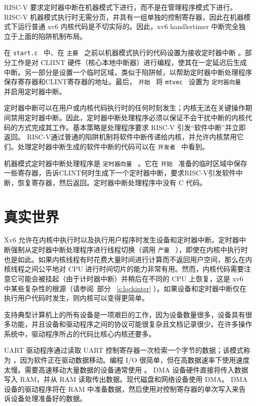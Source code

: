 \documentclass[UTF8]{article}
\begin{document}
RISC-V 要求定时器中断在机器模式下进行，而不是在管理程序模式下进行。 RISC-V 机器模式执行时无需分页，并具有一组单独的控制寄存器，因此在机器模式下运行普通 xv6 内核代码是不切实际的。因此，xv6 handlertimer 中断完全独立于上面的陷阱机制布局。  

在  {    \tt    start.c   }  中、在  {    \tt    主要   }  之前以机器模式执行的代码设置为接收定时器中断
        。部分工作是对 CLIINT 硬件（核心本地中断器）进行编程，使其在一定延迟后生成中断。另一部分是设置一个临时区域，类似于陷阱帧，以帮助定时器中断处理程序保存寄存器和CLINT寄存器的地址。最后， {    \tt    开始   }  将  {    \tt    mtvec   }  设置为  {    \tt    定时器向量   }  并启用定时器中断。  

定时器中断可以在用户或内核代码执行时的任何时刻发生；内核无法在关键操作期间禁用定时器中断。因此，定时器中断处理程序必须以保证不会干扰中断的内核代码的方式完成其工作。基本策略是处理程序要求 RISC-V 引发“软件中断”并立即返回。 RISC-V通过普通的陷阱机制将软件中断传递给内核，并允许内核禁用它们。处理定时器中断生成的软件中断的代码可以在  {    \tt    开发者   }         中看到。  

机器模式定时器中断处理程序是  {    \tt    定时器向量   } 
        。它在 {    \tt    开始   } 准备的临时区域中保存一些寄存器，告诉CLINT何时生成下一个定时器中断，要求RISC-V引发软件中断，恢复寄存器，然后返回。定时器中断处理程序中没有 C 代码。  

   \section{真实世界  }     

Xv6 允许在内核中执行时以及执行用户程序时发生设备和定时器中断。定时器中断强制从定时器中断处理程序进行线程切换（调用  {    \tt    产量   }  ），即使在内核中执行时也是如此。如果内核线程有时花费大量时间进行计算而不返回用户空间，那么在内核线程之间公平地对 CPU 进行时间切片的能力非常有用。然而，内核代码需要注意它可能会被挂起（由于计时器中断）并稍后在不同的 CPU 上恢复，这是 xv6 中某些复杂性的根源（请参阅~部分~    \ref{s:lockinter}    ）。如果设备和定时器中断仅在执行用户代码时发生，则内核可以变得更简单。  

支持典型计算机上的所有设备是一项艰巨的工作，因为设备数量很多，设备具有很多功能，并且设备和驱动程序之间的协议可能很复杂且文档记录很少。在许多操作系统中，驱动程序所占的代码比核心内核还要多。  

UART 驱动程序通过读取 UART 控制寄存器一次检索一个字节的数据；该模式称为        ，因为软件正在驱动数据移动。编程 I/O 很简单，但在高数据速率下使用速度太慢。需要高速移动大量数据的设备通常使用        。 DMA 设备硬件直接将传入数据写入 RAM，并从 RAM 读取传出数据。现代磁盘和网络设备使用 DMA。 DMA 设备的驱动程序将在 RAM 中准备数据，然后使用对控制寄存器的单次写入来告诉设备处理准备好的数据。  
\end{document}
